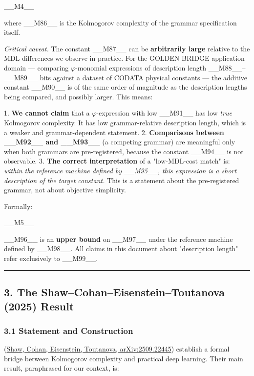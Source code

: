 \_\_M4\_\_

where \_\_M86\_\_ is the Kolmogorov complexity of the grammar specification itself.

\textit{Critical caveat.} The constant \_\_M87\_\_ can be \textbf{arbitrarily large} relative to the MDL differences we observe in practice. For the GOLDEN BRIDGE application domain --- comparing $\varphi$-monomial expressions of description length \_\_M88\_\_--\_\_M89\_\_ bits against a dataset of CODATA physical constants --- the additive constant \_\_M90\_\_ is of the same order of magnitude as the description lengths being compared, and possibly larger. This means:

1. \textbf{We cannot claim} that a $\varphi$-expression with low \_\_M91\_\_ has low \textit{true} Kolmogorov complexity. It has low grammar-relative description length, which is a weaker and grammar-dependent statement.
2. \textbf{Comparisons between \_\_M92\_\_ and \_\_M93\_\_} (a competing grammar) are meaningful only when both grammars are pre-registered, because the constant \_\_M94\_\_ is not observable.
3. \textbf{The correct interpretation} of a "low-MDL-cost match" is: \textit{within the reference machine defined by \_\_M95\_\_, this expression is a short description of the target constant.} This is a statement about the pre-registered grammar, not about objective simplicity.

Formally:

\_\_M5\_\_

\_\_M96\_\_ is an \textbf{upper bound} on \_\_M97\_\_ under the reference machine defined by \_\_M98\_\_. All claims in this document about "description length" refer exclusively to \_\_M99\_\_.

\noindent\rule{\textwidth}{0.4pt}

\subsection{3. The Shaw--Cohan--Eisenstein--Toutanova (2025) Result}

\subsubsection{3.1 Statement and Construction}

(\href{https://arxiv.org/abs/2509.22445}{Shaw, Cohan, Eisenstein, Toutanova, arXiv:2509.22445}) establish a formal bridge between Kolmogorov complexity and practical deep learning. Their main result, paraphrased for our context, is:

